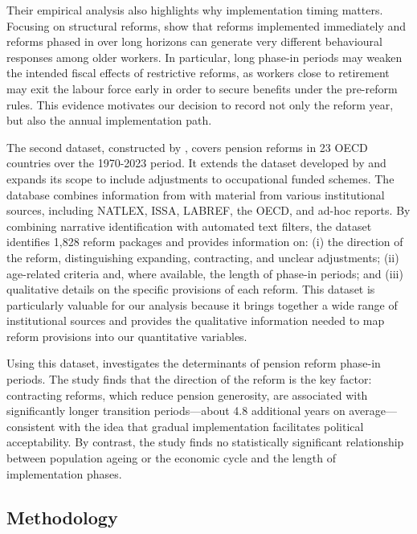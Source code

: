 \documentclass[11pt,english,a4paper, twoside, authoryear]{article}
\begin{document}
Their empirical analysis also highlights why implementation timing matters. Focusing on structural reforms, \citet{BiZubairy2023} show that reforms implemented immediately and reforms phased in over long horizons can generate very different behavioural responses among older workers. In particular, long phase-in periods may weaken the intended fiscal effects of restrictive reforms, as workers close to retirement may exit the labour force early in order to secure benefits under the pre-reform rules. This evidence motivates our decision to record not only the reform year, but also the annual implementation path.


The second dataset, constructed by \citet{romp_political_2024}, covers pension reforms in 23 OECD countries over the 1970-2023 period. It extends the dataset developed by \citet{Beetsma2020} and expands its scope to include adjustments to occupational funded schemes. The database combines information from \citet{BiZubairy2023} with material from various institutional sources, including NATLEX, ISSA, LABREF, the OECD, and ad-hoc reports. By combining narrative identification with automated text filters, the dataset identifies 1,828 reform packages and provides information on: (i) the direction of the reform, distinguishing expanding, contracting, and unclear adjustments; (ii) age-related criteria and, where available, the length of phase-in periods; and (iii) qualitative details on the specific provisions of each reform. This dataset is particularly valuable for our analysis because it brings together a wide range of institutional sources and provides the qualitative information needed to map reform provisions into our quantitative variables.

Using this dataset, \citet{romp_political_2024} investigates the determinants of pension reform phase-in periods. The study finds that the direction of the reform is the key factor: contracting reforms, which reduce pension generosity, are associated with significantly longer transition periods---about 4.8 additional years on average---consistent with the idea that gradual implementation facilitates political acceptability. By contrast, the study finds no statistically significant relationship between population ageing or the economic cycle and the length of implementation phases.


\subsection{Methodology}
\label{sec:methodo}
\end{document}
